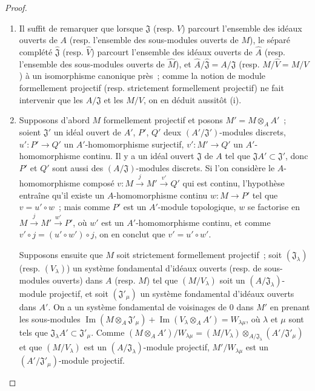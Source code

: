 \begin{proof}
\begin{enumerate}
  \item[(i)] Il suffit de remarquer que lorsque $\mathfrak J$ (resp. $V$)
  parcourt l'ensemble des idéaux ouverts de $A$ (resp. l'ensemble des
  sous-modules ouverts de $M$), le séparé complété $\hat{\mathfrak J}$
  (resp. $\hat V$) parcourt l'ensemble des idéaux ouverts de $\hat A$
  (resp. l'ensemble des sous-modules ouverts de $\hat M$), et
  $\hat A/\hat{\mathfrak J}=A/\mathfrak J$ (resp.
  $\hat M/\hat V=M/V$) à un isomorphisme canonique près~; comme la notion
  de module formellement projectif (resp. strictement formellement projectif)
  ne fait intervenir que les $A/\mathfrak J$ et les $M/V$, on en déduit
  aussitôt (i).
  \item[(ii)] Supposons d'abord $M$ formellement projectif et posons
  $M'=M\otimes_A A'$~; soient $\mathfrak J'$ un idéal ouvert de $A'$, $P'$,
  $Q'$ deux $(A'/\mathfrak J')$-modules discrets, $u':P'\to Q'$ un
  $A'$-homomorphisme surjectif, $v':M'\to Q'$ un $A'$-homomorphisme continu.
  Il y a un idéal ouvert $\mathfrak J$ de $A$ tel que
  $\mathfrak JA'\subset\mathfrak J'$, donc $P'$ et $Q'$ sont aussi des
  $(A/\mathfrak J)$-modules discrets. Si l'on considère le
  $A$-homomorphisme composé $v:M\xrightarrow{j}M'\xrightarrow{v'}Q'$ qui est
  continu, l'hypothèse entraîne qu'il existe un $A$-homomorphisme continu
  $w:M\to P'$ tel que $v=u'\circ w$~; mais comme $P'$ est un $A'$-module
  topologique, $w$ se factorise en
  $M\xrightarrow{j}M'\xrightarrow{w'}P'$, où $w'$ est un $A'$-homomorphisme
  continu, et comme $v'\circ j=(u'\circ w')\circ j$, on en conclut que
  $v'=u'\circ w'$.

  Supposons ensuite que $M$ soit strictement formellement projectif~; soit
  $(\mathfrak J_\lambda)$ (resp. $(V_\lambda)$) un système fondamental
  d'idéaux ouverts (resp. de sous-modules ouverts) dans $A$ (resp. $M$) tel
  que $(M/V_\lambda)$ soit un $(A/\mathfrak J_\lambda)$-module projectif,
  et soit $(\mathfrak J'_\mu)$ un système fondamental d'idéaux ouverts dans
  $A'$. On a un système fondamental de voisinages de $0$ dans $M'$ en prenant
  les sous-modules
  $\operatorname{Im}(M\otimes_A\mathfrak J'_\mu)
    +\operatorname{Im}(V_\lambda\otimes_A A')=W_{\lambda\mu}$,
  où $\lambda$ et $\mu$ sont tels que
  $\mathfrak J_\lambda A'\subset\mathfrak J'_\mu$. Comme
  $(M\otimes_A A')/W_{\lambda\mu}
    =(M/V_\lambda)\otimes_{A/\mathfrak J_\lambda}
      (A'/\mathfrak J'_\mu)$
  et que $(M/V_\lambda)$ est un
  $(A/\mathfrak J_\lambda)$-module projectif, $M'/W_{\lambda\mu}$
  est un $(A'/\mathfrak J'_\mu)$-module projectif.
\end{enumerate}
\end{proof}

